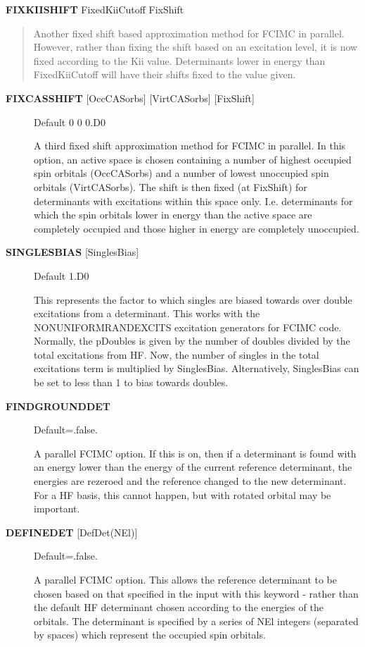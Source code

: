 \documentclass[openany,a4paper,10pt,english]{manual}
\begin{document}
\textbf{FIXKIISHIFT} FixedKiiCutoff FixShift
\begin{quote}

Another fixed shift based approximation method for FCIMC in parallel. However, rather
than fixing the shift based on an excitation level, it is now fixed according to the
Kii value. Determinants lower in energy than FixedKiiCutoff will have their shifts
fixed to the value given.
\end{quote}
\begin{description}
\item[\textbf{FIXCASSHIFT} {[}OccCASorbs{]} {[}VirtCASorbs{]} {[}FixShift{]}] \leavevmode
Default 0 0 0.D0

A third fixed shift approximation method for FCIMC in parallel.  In this option, an active
space is chosen containing a number of highest occupied spin orbitals (OccCASorbs) and a
number of lowest unoccupied spin orbitals (VirtCASorbs).  The shift is then fixed (at FixShift)
for determinants with excitations within this space only.  I.e. determinants for which the spin
orbitals lower in energy than the active space are completely occupied and those higher in
energy are completely unoccupied.

\item[\textbf{SINGLESBIAS} {[}SinglesBias{]}] \leavevmode
Default 1.D0

This represents the factor to which singles are biased towards over double excitations from a determinant.
This works with the NONUNIFORMRANDEXCITS excitation generators for FCIMC code. Normally, the
pDoubles is given by the number of doubles divided by the total excitations from HF. Now,
the number of singles in the total excitations term is multiplied by SinglesBias. Alternatively,
SinglesBias can be set to less than 1 to bias towards doubles.

\item[\textbf{FINDGROUNDDET}] \leavevmode
Default=.false.

A parallel FCIMC option. If this is on, then if a determinant is found with an energy lower
than the energy of the current reference determinant, the energies are rezeroed and the
reference changed to the new determinant. For a HF basis, this cannot happen, but with
rotated orbital may be important.

\item[\textbf{DEFINEDET} {[}DefDet(NEl){]}] \leavevmode
Default=.false.

A parallel FCIMC option.  This allows the reference determinant to be chosen based on that specified in
the input with this keyword - rather than the default HF determinant chosen according to the energies of
the orbitals.  The determinant is specified by a series of NEl integers (separated by spaces)
which represent the occupied spin orbitals.


\end{description}
\end{document}
